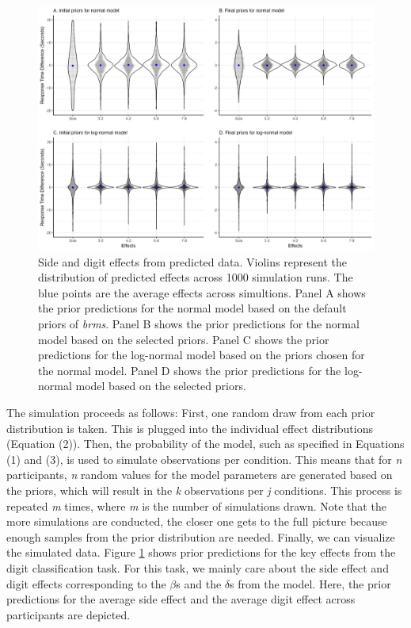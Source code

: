 \documentclass[
  english,
  doc,floatsintext]{apa6}
\begin{document}
\begin{figure}[H]

\includegraphics[width=1\linewidth]{I - Images/Fig6_priorpredfigure_v2} \hfill{}

\caption{Side and digit effects from predicted data. Violins represent the distribution of predicted effects across 1000 simulation runs. The blue points are the average effects across simultions. Panel A shows the prior predictions for the normal model based on the default priors of \textit{brms}. Panel B shows the prior predictions for the normal model based on the selected priors. Panel C shows the prior predictions for the log-normal model based on the priors chosen for the normal model. Panel D shows the prior predictions for the log-normal model based on the selected priors.}\label{fig:priorpredfigurepanel}
\end{figure}

The simulation proceeds as follows: First, one random draw from each prior distribution is taken. This is plugged into the individual effect distributions (Equation (2)). Then, the probability of the model, such as specified in Equations (1) and (3), is used to simulate observations per condition. This means that for \emph{n} participants, \emph{n} random values for the model parameters are generated based on the priors, which will result in the \emph{k} observations per \emph{j} conditions. This process is repeated \emph{m} times, where \emph{m} is the number of simulations drawn. Note that the more simulations are conducted, the closer one gets to the full picture because enough samples from the prior distribution are needed. Finally, we can visualize the simulated data. Figure \ref{fig:priorpredfigurepanel} shows prior predictions for the key effects from the digit classification task. For this task, we mainly care about the side effect and digit effects corresponding to the \(\beta\)s and the \(\delta\)s from the model. Here, the prior predictions for the average side effect and the average digit effect across participants are depicted.
\end{document}
